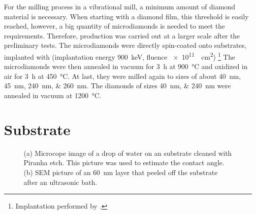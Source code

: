 	For the milling process in a vibrational mill, a minimum amount of diamond material is necessary.
	When starting with a diamond film, this threshold is easily reached, however, a big quantity of microdiamonds is needed to meet the requirements.
	Therefore, production was carried out at a larger scale after the preliminary tests.
	The microdiamonds were directly spin-coated onto \ir substrates, implanted with  (implantation energy \SI{900}{keV}, fluence \SI{e11}{\per\centi\meter\squared}) \footnote{Implantation performed by \klug.}
	The microdiamonds were then annealed in vacuum for \SI{3}{\hour} at \SI{900}{\celsius} and oxidized in air for \SI{3}{\hour} at \SI{450}{\celsius}.
	At last, they were milled again to sizes of about \SIlist{40;45;240;260}{nm}.
	The diamonds of sizes \SIlist{40;240}{nm} were annealed in vacuum at \SI{1200}{\celsius}.









\section{\Ir Substrate}\label{sec::ir_substrate}


\begin{figure}[tp]
	\begin{subfigure}[t]{ 0.49\linewidth}
		\caption{}\label{subfig::wetting}
		\centering
	\end{subfigure}
	\hfill
	\begin{subfigure}[t]{ 0.49\linewidth}
		\caption{}\label{subfig::peeled_ir}
		\centering
	\end{subfigure}
	\caption{(a) Microcope image of a drop of water on an \ir substrate cleaned with Piranha etch. This picture was used to estimate the contact angle. (b) SEM picture of an \SI{60}{nm} \ir layer that peeled off the substrate after an ultrasonic bath.}
	\label{fig::sem_substrates}
\end{figure}


